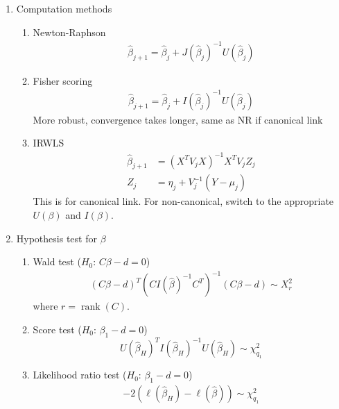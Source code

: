 \message{ !name(biostat651_summary.tex)}\documentclass{amsart}
\begin{document}
\begin{enumerate}
\item Computation methods
  \begin{enumerate}
  \item Newton-Raphson
    \begin{align*}
      \hat{\beta}_{j+1} = \hat{\beta}_j + J(\hat{\beta}_j)^{-1} U(\hat{\beta}_j)
    \end{align*}
  \item Fisher scoring
    \begin{align*}
      \hat{\beta}_{j+1} = \hat{\beta}_j + I(\hat{\beta}_j)^{-1} U(\hat{\beta}_j)
    \end{align*}
    More robust, convergence takes longer, same as NR if canonical
    link
  \item IRWLS
    \begin{align*}
      \hat{\beta}_{j+1} & = (X^T V_j X)^{-1} X^T V_j Z_j \\
      Z_j & = \eta_j + V_j^{-1}(Y - \mu_j)
    \end{align*}
    This is for canonical link. For non-canonical, switch to the
    appropriate $U(\beta)$ and $I(\beta)$.


  \end{enumerate}
  
\item Hypothesis test for $\beta$
  \begin{enumerate}
  \item Wald test ($H_0$: $C\beta - d = 0$)
    \begin{align*}
      (C\beta - d)^T (C I(\hat{\beta})^{-1} C^T)^{-1} (C\beta-d) \sim X_r^2
    \end{align*}
    where $r = \operatorname{rank}(C)$.
  \item Score test ($H_0$: $\beta_1 - d = 0$)
    \begin{equation*}
      U(\hat{\beta}_H)^T I(\hat{\beta}_H)^{-1} U(\hat{\beta}_H)
      \sim \chi^2_{q_1}
    \end{equation*}
  \item Likelihood ratio test ($H_0$: $\beta_1 - d = 0$)
    \begin{align*}
      -2 (\ell(\hat{\beta}_H) - \ell(\hat{\beta})) \sim \chi^2_{q_1}
    \end{align*}
  \end{enumerate}


\end{enumerate}
\end{document}
